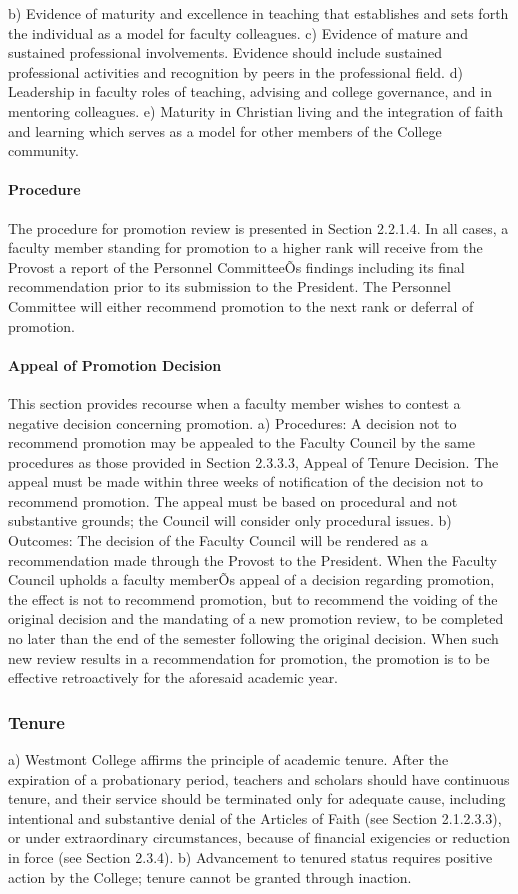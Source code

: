 \documentclass[letterpaper, 11pt]{article}
\begin{document}
				b) Evidence of maturity and excellence in teaching that establishes and sets forth the individual as a model for faculty colleagues.
				c) Evidence of mature and sustained professional involvements. Evidence should include sustained professional activities and recognition by peers in the professional field.
				d) Leadership in faculty roles of teaching, advising and college governance, and in mentoring colleagues.
				e) Maturity in Christian living and the integration of faith and learning which serves as a model for other members of the College community.
			\paragraph{Procedure}
				The procedure for promotion review is presented in Section 2.2.1.4.  In all cases, a faculty member standing for promotion to a higher rank will receive from the Provost a report of the Personnel CommitteeÕs findings including its final recommendation prior to its submission to the President.  The Personnel Committee will either recommend promotion to the next rank or deferral of promotion.
			\paragraph{Appeal of Promotion Decision}
				This section provides recourse when a faculty member wishes to contest a negative decision concerning promotion.
				a) Procedures:
				A decision not to recommend promotion may be appealed to the Faculty Council by the same procedures as those provided in Section 2.3.3.3, Appeal of Tenure Decision. The appeal must be made within three weeks of notification of the decision not to recommend promotion. The appeal must be based on procedural and not substantive grounds; the Council will consider only procedural issues.
				b) Outcomes:
				The decision of the Faculty Council will be rendered as a recommendation made through the Provost to the President. When the Faculty Council upholds a faculty memberÕs appeal of a decision regarding promotion, the effect is not to recommend promotion, but to recommend the voiding of the original decision and the mandating of a new promotion review, to be completed no later than the end of the semester following the original decision.  When such new review results in a recommendation for promotion, the promotion is to be effective retroactively for the aforesaid academic year.
		\subsubsection{Tenure}
			a) Westmont College affirms the principle of academic tenure.  After the expiration of a probationary period, teachers and scholars should have continuous tenure, and their service should be terminated only for adequate cause, including intentional and substantive denial of the Articles of Faith (see Section 2.1.2.3.3), or under extraordinary circumstances, because of financial exigencies or reduction in force (see Section 2.3.4).
			b) Advancement to tenured status requires positive action by the College; tenure cannot be granted through inaction.
\end{document}
